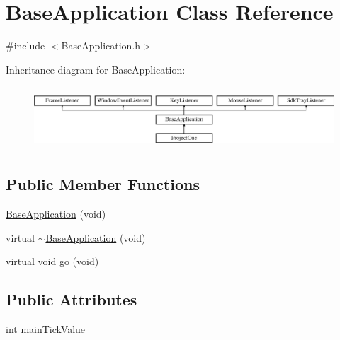 \hypertarget{class_base_application}{\section{Base\-Application Class Reference}
\label{class_base_application}
}


{\ttfamily \#include $<$Base\-Application.\-h$>$}

Inheritance diagram for Base\-Application\-:\begin{figure}[H]
\begin{center}
\leavevmode
\includegraphics[height=2.382979cm]{class_base_application}
\end{center}
\end{figure}
\subsection*{Public Member Functions}
\begin{DoxyCompactItemize}
\item 
\hyperlink{class_base_application_a7c897f08816cc064568ae1ec71026719}{Base\-Application} (void)
\item 
virtual \hyperlink{class_base_application_a39133f736b9eb70263cebaca3e6d2cad}{$\sim$\-Base\-Application} (void)
\item 
virtual void \hyperlink{class_base_application_aed497661d1817ed9d659fb4de671ac1c}{go} (void)
\end{DoxyCompactItemize}
\subsection*{Public Attributes}
\begin{DoxyCompactItemize}
\item 
int \hyperlink{class_base_application_adf36bb25e5d307e0b4433489c8227b46}{main\-Tick\-Value}
\end{DoxyCompactItemize}
